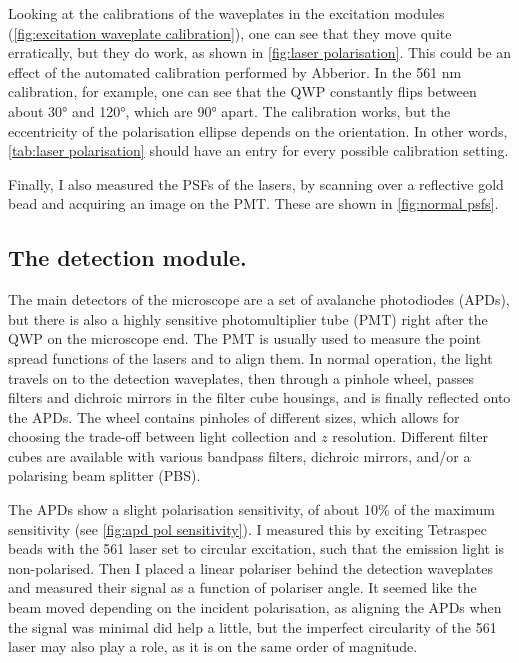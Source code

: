 Looking at the calibrations of the waveplates in the excitation modules (\autoref{fig:excitation waveplate calibration}), one can see that they move quite erratically, but they do work, as shown in \autoref{fig:laser polarisation}. This could be an effect of the automated calibration performed by Abberior. In the 561 nm calibration, for example, one can see that the QWP constantly flips between about \ang{30} and \ang{120}, which are \ang{90} apart. The calibration works, but the eccentricity of the polarisation ellipse depends on the orientation. In other words, \autoref{tab:laser polarisation} should have an entry for every possible calibration setting.

Finally, I also measured the PSFs of the lasers, by scanning over a reflective gold bead and acquiring an image on the PMT. These are shown in \autoref{fig:normal psfs}.

\subsection{The detection module.} The main detectors of the microscope are a set of avalanche photodiodes (APDs), but there is also a highly sensitive photomultiplier tube (PMT) right after the QWP on the microscope end. The PMT is usually used to measure the point spread functions of the lasers and to align them. In normal operation, the light travels on to the detection waveplates, then through a pinhole wheel, passes filters and dichroic mirrors in the filter cube housings, and is finally reflected onto the APDs. The wheel contains pinholes of different sizes, which allows for choosing the trade-off between light collection and $ z $ resolution. Different filter cubes are available with various bandpass filters, dichroic mirrors, and/or a polarising beam splitter (PBS).

The APDs show a slight polarisation sensitivity, of about 10\% of the maximum sensitivity (see \autoref{fig:apd pol sensitivity}). I measured this by exciting Tetraspec beads with the 561 laser set to circular excitation, such that the emission light is non-polarised. Then I placed a linear polariser behind the detection waveplates and measured their signal as a function of polariser angle. It seemed like the beam moved depending on the incident polarisation, as aligning the APDs when the signal was minimal did help a little, but the imperfect circularity of the 561 laser may also play a role, as it is on the same order of magnitude. 

